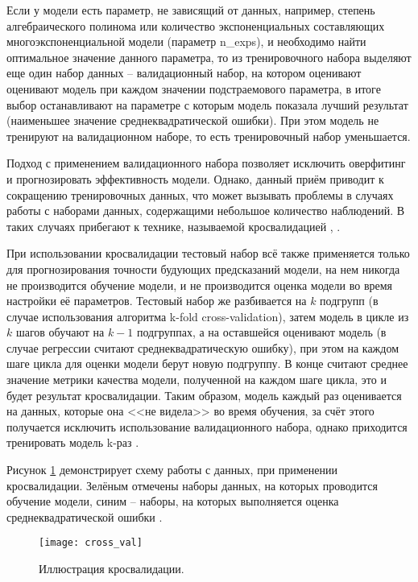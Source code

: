     Если у модели есть параметр, не зависящий от данных, например, степень
    алгебраического полинома или количество экспоненциальных составляющих 
    многоэкспоненциальной модели (параметр n\_exps), и необходимо найти 
    оптимальное значение данного параметра, то из тренировочного набора выделяют
    еще один набор данных -- валидационный набор, на котором оценивают
    оценивают модель при каждом значении подстраемового параметра, в итоге
    выбор останавливают на параметре с которым модель показала лучший результат
    (наименьшее значение среднеквадратической ошибки). При этом модель не 
    тренируют на валидационном наборе, то есть тренировочный набор уменьшается.

    Подход с применением валидационного набора позволяет исключить оверфитинг 
    и прогнозировать эффективность модели. Однако, данный приём приводит к 
    сокращению тренировочных данных, что может вызывать проблемы в случаях 
    работы с наборами данных, содержащими небольшое количество наблюдений. В 
    таких случаях прибегают к технике, называемой кросвалидацией \cite{hands_on_ml}, 
    \cite{sklearn_cross_validation}.

    При использовании кросвалидации тестовый набор всё также применяется только
    для прогнозирования точности будующих предсказаний модели, на нем никогда 
    не производится обучение модели, и не производится оценка модели во время
    настройки её параметров. Тестовый набор же разбивается на $k$ подгрупп
    (в случае использования алгоритма k-fold cross-validation), затем модель
    в цикле из $k$ шагов обучают на $k-1$ подгруппах, а на оставшейся оценивают 
    модель (в случае регрессии считают среднеквадратическую ошибку), при этом 
    на каждом шаге цикла для оценки модели берут новую подгруппу. В конце 
    считают среднее значение метрики качества модели, полученной на каждом шаге
    цикла, это и будет результат кросвалидации. Таким образом, модель каждый 
    раз оценивается на данных, которые она <<не видела>> во время обучения, за
    счёт этого получается исключить использование валидационного набора, однако
    приходится тренировать модель k-раз \cite{sklearn_cross_validation}. 

    Рисунок \ref{pic:cross_val} демонстрирует схему работы с данных, при 
    применении кросвалидации. Зелёным отмечены наборы данных, на которых 
    проводится обучение модели, синим -- наборы, на которых выполняется оценка
    среднеквадратической ошибки \cite{sklearn_cross_validation}.

    \begin{figure}[!htp]
        \centering
        \texttt{[image: cross\_val]}
        \caption{Иллюстрация кросвалидации.}
        \label{pic:cross_val}
    \end{figure}

